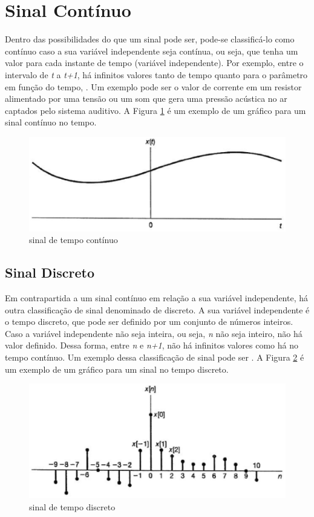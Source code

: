 \section{Sinal Contínuo}
Dentro das possibilidades do que um sinal pode ser, pode-se classificá-lo como contínuo caso a sua variável independente seja contínua, ou seja, que tenha um valor para cada instante de tempo (variável independente). Por exemplo, entre o intervalo de \textit{t} a \textit{t+1}, há infinitos valores tanto de tempo quanto para o parâmetro em função do tempo, \cite{oppenheim2010sinais}. Um exemplo pode ser o valor de corrente em um resistor alimentado por uma tensão ou um som que gera uma pressão acústica no ar captados pelo sistema auditivo. A Figura \ref{fig01} é um exemplo de um gráfico para um sinal contínuo no tempo. 
\begin{figure}[h]
	\centering
	\includegraphics[scale=0.5]{figuras/fig01.eps}
	\caption{sinal de tempo contínuo \cite{oppenheim2010sinais}}
	\label{fig01}
\end{figure}
\newpage

\subsection{Sinal Discreto}
Em contrapartida a um sinal contínuo em relação a sua variável independente, há outra classificação de sinal denominado de discreto. A sua variável independente é o tempo discreto, que pode ser definido por um conjunto de números inteiros. Caso a variável independente não seja inteira, ou seja, \textit{n} não seja inteiro, não há  valor definido. Dessa forma, entre \textit{n} e \textit{n+1}, não há infinitos valores como há no tempo contínuo. Um exemplo dessa classificação de sinal pode ser \cite{oppenheim2010sinais}. A Figura \ref{fig02} é um exemplo de um gráfico para um sinal no tempo discreto.

\begin{figure}[h]
	\centering
    \includegraphics[scale=0.5]{figuras/fig02.eps}
	\caption{sinal de tempo discreto \cite{oppenheim2010sinais}}
	\label{fig02}
\end{figure}

